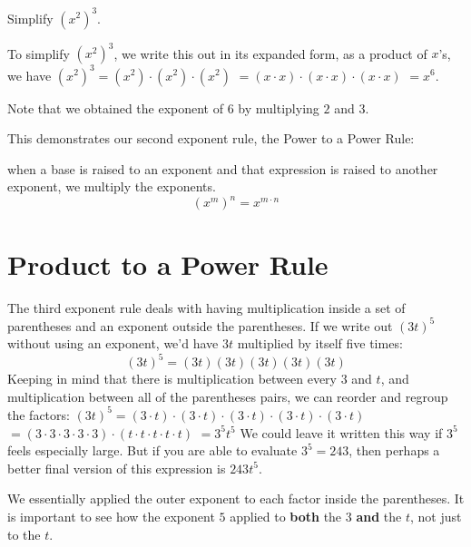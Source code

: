 \documentclass{ximera}
\begin{document}
\begin{example}
          Simplify $\left(x^2\right)^3$.\\
\begin{explanation}
          To simplify $\left(x^2\right)^3$,
          we write this out in its expanded form,
          as a product of $x$'s, we have
            $\left(x^2\right)^3 =\left(x^2\right) \cdot \left(x^2\right)\cdot\left(x^2\right)$
            $=(x \cdot x)\cdot (x \cdot x)\cdot (x \cdot x)$
            $=x^6$.
     \end{explanation}
           
           Note that we obtained the exponent of $6$ by multiplying $2$ and $3$.
\end{example}
      This demonstrates our second exponent rule,
      the Power to a Power Rule:
\begin{theorem}
      when a base is raised to an exponent and that expression is raised to another exponent,
      we multiply the exponents.
   $$
      \left(x^m\right)^n = x^{m \cdot n}
   $$
\end{theorem}

      \section{Product to a Power Rule}
        The third exponent rule deals with having multiplication inside a set of parentheses and an exponent outside the parentheses.
        If we write out $\left(3t\right)^5$ without using an exponent,
        we'd have $3t$ multiplied by itself five times:
$$
      (3t)^5= (3t)(3t)(3t)(3t)(3t)
$$
        Keeping in mind that there is multiplication between every $3$ and $t$,
        and multiplication between all of the parentheses pairs,
        we can reorder and regroup the factors:
          $\left(3t\right)^5 = (3\cdot t)\cdot (3\cdot t)\cdot (3\cdot t)\cdot (3\cdot t)\cdot (3\cdot t)$
          $= \left(3\cdot 3\cdot 3\cdot 3\cdot 3 \right) \cdot \left(t \cdot t \cdot t \cdot t \cdot t\right)$
          $= 3^5 t^5$
        We could leave it written this way if $3^5$ feels especially large.
        But if you are able to evaluate $3^5=243$,
        then perhaps a better final version of this expression is $243t^5$.
 
        We essentially applied the outer exponent to each factor inside the parentheses.
        It is important to see how the exponent $5$ applied to \textbf{both} the $3$ \textbf{and} the $t$,
        not just to the $t$.
   
\end{document}
